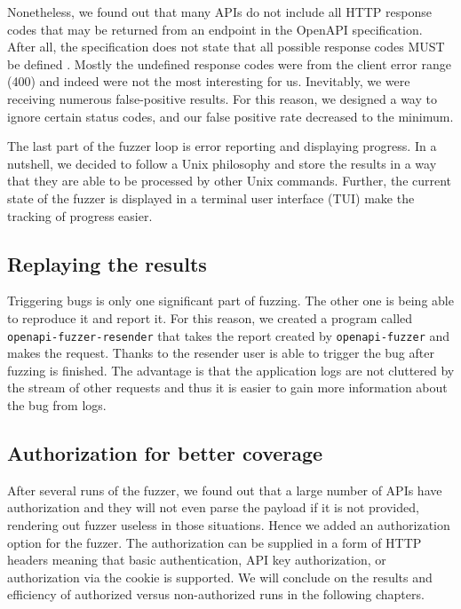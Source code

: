 Nonetheless, we found out that many APIs do not include all HTTP response codes that may be returned from an endpoint in the OpenAPI specification. After all, the specification does not state that all possible response codes MUST be defined \cite{openapi2020github}. Mostly the undefined response codes were from the client error range (400) and indeed were not the most interesting for us. Inevitably, we were receiving numerous false-positive results. For this reason, we designed a way to ignore certain status codes, and our false positive rate decreased to the minimum.

The last part of the fuzzer loop is error reporting and displaying progress. In a nutshell, we decided to follow a Unix philosophy and store the results in a way that they are able to be processed by other Unix commands. Further, the current state of the fuzzer is displayed in a terminal user interface (TUI) make the tracking of progress easier.

\subsection{Replaying the results}
Triggering bugs is only one significant part of fuzzing. The other one is being able to reproduce it and report it. For this reason, we created a program called \newline \texttt{openapi-fuzzer-resender} that takes the report created by \texttt{openapi-fuzzer} and makes the request. Thanks to the resender user is able to trigger the bug after fuzzing is finished. The advantage is that the application logs are not cluttered by the stream of other requests and thus it is easier to gain more information about the bug from logs.

\subsection{Authorization for better coverage}
After several runs of the fuzzer, we found out that a large number of APIs have authorization and they will not even parse the payload if it is not provided, rendering out fuzzer useless in those situations. Hence we added an authorization option for the fuzzer. The authorization can be supplied in a form of HTTP headers meaning that basic authentication, API key authorization, or authorization via the cookie is supported. We will conclude on the results and efficiency of authorized versus non-authorized runs in the following chapters.
